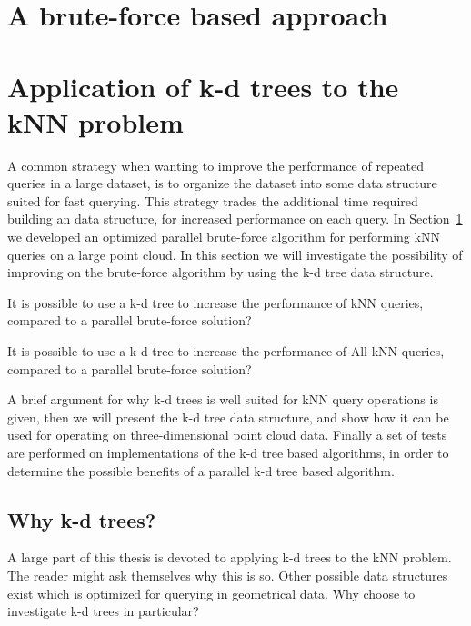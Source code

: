 \section{A brute-force based approach} %
\label{sub:investigation_of_a_brute_force_approach_based_on_garcia}




\section{Application of k-d trees to the kNN problem} %
\label{sub:application_of_kd_trees_to_the_knn_problem}

A common strategy when wanting to improve the performance of repeated queries in a large dataset, is to organize the dataset into some data structure suited for fast querying. This strategy trades the additional time required building an data structure, for increased performance on each query. In Section~\ref{sub:investigation_of_a_brute_force_approach_based_on_garcia} we developed an optimized parallel brute-force algorithm for performing kNN queries on a large point cloud. In this section we will investigate the possibility of improving on the brute-force algorithm by using the k-d tree data structure.

\begin{myrq}
\label{rq:serial-kd-tree}
    It is possible to use a k-d tree to increase the performance of kNN queries, compared to a parallel brute-force solution?
\end{myrq}

\begin{myrq}
\label{rq:serial-kd-tree-all-knn}
    It is possible to use a k-d tree to increase the performance of All-kNN queries, compared to a parallel brute-force solution?
\end{myrq}

A brief argument for why k-d trees is well suited for kNN query operations is given, then we will present the k-d tree data structure, and show how it can be used for operating on three-dimensional point cloud data. Finally a set of tests are performed on implementations of the k-d tree based algorithms, in order to determine the possible benefits of a parallel k-d tree based algorithm.

\subsection{Why k-d trees?} %
\label{sub:why_k_d_trees_}
A large part of this thesis is devoted to applying k-d trees to the kNN problem. The reader might ask themselves why this is so. Other possible data structures exist which is optimized for querying in geometrical data. Why choose to investigate k-d trees in particular?


